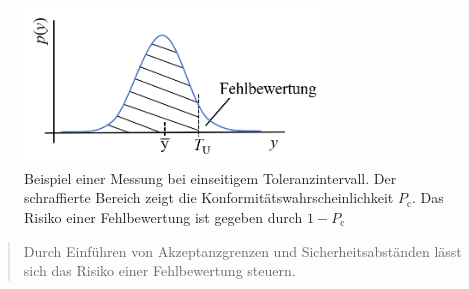 \begin{figure}[!htp]
	\begin{center}
		\includegraphics[width=80mm]{05_vorlesung/media/Fehlbewertung.png}
		\caption{\label{fig:Produktion_Widerstaende} Beispiel einer Messung bei einseitigem Toleranzintervall. Der schraffierte Bereich zeigt die Konformitätswahrscheinlichkeit $P_\mathrm{c}$. Das Risiko einer Fehlbewertung ist gegeben durch $1- P_\mathrm{c}$}
	\end{center}
\end{figure}

\begin{quote}
Durch Einführen von Akzeptanzgrenzen und Sicherheitsabständen lässt sich das Risiko einer Fehlbewertung steuern.
\end{quote}

